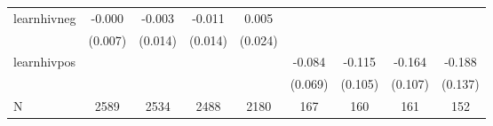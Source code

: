 \begin{tabular}{lcccccccc}
\hline
learnhivneg & -0.000 & -0.003 & -0.011 & 0.005 &  &  &  &  \\
 & (0.007) & (0.014) & (0.014) & (0.024) &  &  &  &  \\
learnhivpos &  &  &  &  & -0.084 & -0.115 & -0.164 & -0.188 \\
 &  &  &  &  & (0.069) & (0.105) & (0.107) & (0.137) \\
\hline
N & 2589 & 2534 & 2488 & 2180 & 167 & 160 & 161 & 152 \\
\hline
\end{tabular}

